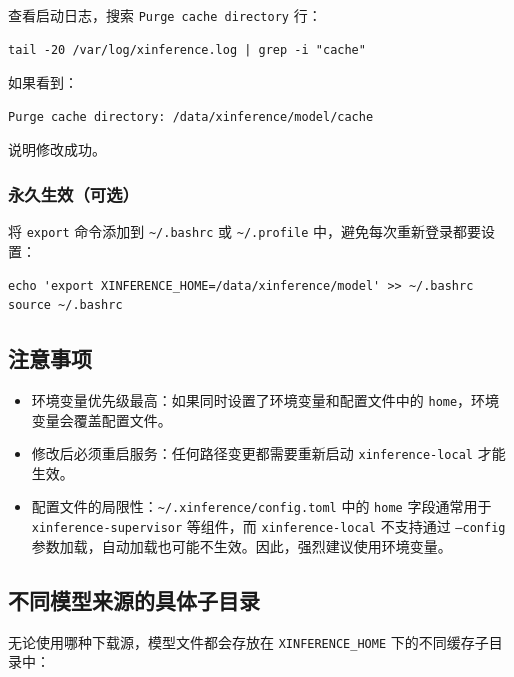 \documentclass[12pt,UTF8]{ctexbook}
\begin{document}
查看启动日志，搜索 \texttt{Purge cache directory} 行：

\begin{lstlisting}
tail -20 /var/log/xinference.log | grep -i "cache"
\end{lstlisting}

如果看到：

\begin{lstlisting}
Purge cache directory: /data/xinference/model/cache
\end{lstlisting}

说明修改成功。

\subsubsection{永久生效（可选）}

将 \texttt{export} 命令添加到 \texttt{\textasciitilde/.bashrc} 或 \texttt{\textasciitilde/.profile} 中，避免每次重新登录都要设置：

\begin{lstlisting}
echo 'export XINFERENCE_HOME=/data/xinference/model' >> ~/.bashrc
source ~/.bashrc
\end{lstlisting}

\subsection{注意事项}

\begin{itemize}[leftmargin=2cm]
    \item 环境变量优先级最高：如果同时设置了环境变量和配置文件中的 \texttt{home}，环境变量会覆盖配置文件。
    \item 修改后必须重启服务：任何路径变更都需要重新启动 \texttt{xinference-local} 才能生效。
    \item 配置文件的局限性：\texttt{\textasciitilde/.xinference/config.toml} 中的 \texttt{home} 字段通常用于 \texttt{xinference-supervisor} 等组件，而 \texttt{xinference-local} 不支持通过 \texttt{--config} 参数加载，自动加载也可能不生效。因此，强烈建议使用环境变量。
\end{itemize}

\subsection{不同模型来源的具体子目录}

无论使用哪种下载源，模型文件都会存放在 \texttt{XINFERENCE\_HOME} 下的不同缓存子目录中：
\end{document}
